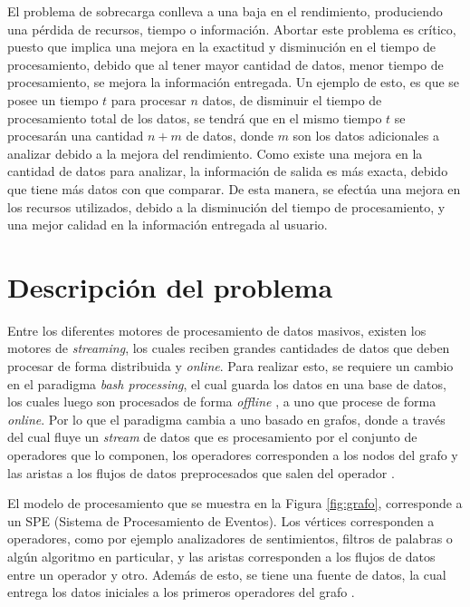 El problema de sobrecarga conlleva a una baja en el rendimiento, produciendo una pérdida de recursos, tiempo o información. Abortar este problema es cr\'itico, puesto que implica una mejora en la exactitud y disminución en el tiempo de procesamiento, debido que al tener mayor cantidad de datos, menor tiempo de procesamiento, se mejora la información entregada. Un ejemplo de esto, es que se posee un tiempo $t$ para procesar $n$ datos, de disminuir el tiempo de procesamiento total de los datos, se tendrá que en el mismo tiempo $t$ se procesarán una cantidad $n+m$ de datos, donde $m$ son los datos adicionales a analizar debido a la mejora del rendimiento. Como existe una mejora en la cantidad de datos para analizar, la información de salida es más exacta, debido que tiene más datos con que comparar. De esta manera, se efectúa una mejora en los recursos utilizados, debido a la disminución del tiempo de procesamiento, y una mejor calidad en la información entregada al usuario.

\section{Descripción del problema}
\label{intro:problema}

Entre los diferentes motores de procesamiento de datos masivos, existen los motores de \textsl{streaming}, los cuales reciben grandes cantidades de datos que deben procesar de forma distribuida y \textsl{online}. Para realizar esto, se requiere un cambio en el paradigma \textsl{bash processing}, el cual guarda los datos en una base de datos, los cuales luego son procesados de forma \textsl{offline} \citep{HawwashN14}, a uno que procese de forma \textsl{online}. Por lo que el paradigma cambia a uno basado en grafos, donde a través del cual fluye un \textsl{stream} de datos que es procesamiento por el conjunto de operadores que lo componen, los operadores corresponden a los nodos del grafo y las aristas a los flujos de datos preprocesados que salen del operador \citep{Shahrivari14}.

El modelo de procesamiento que se muestra en la Figura \ref{fig:grafo}, corresponde a un SPE (Sistema de Procesamiento de Eventos). Los vértices corresponden a operadores, como por ejemplo analizadores de sentimientos, filtros de palabras o algún algoritmo en particular, y las aristas corresponden a los flujos de datos entre un operador y otro. Además de esto, se tiene una fuente de datos, la cual entrega los datos iniciales a los primeros operadores del grafo \citep{AppelFFB12}.

